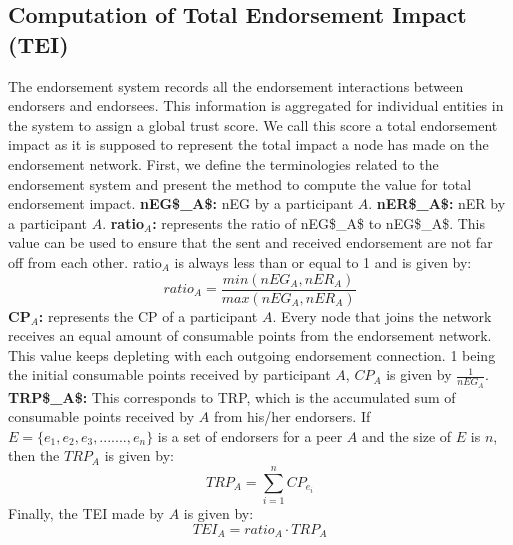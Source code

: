 \subsection{Computation of Total Endorsement Impact (TEI)} \label{computetei}
The endorsement system records all the endorsement interactions between
endorsers and endorsees. This information is aggregated for individual entities
in the system to assign a global trust score. We call this score a total
endorsement impact as it is supposed to represent the total impact a node has
made on the endorsement network. First, we define the terminologies related to
the endorsement system and present the method to compute the value for total
endorsement impact.\newline 
\textbf{{\acrshort{nEG$_A$:}}} \ac{nEG} by a participant $A$. \newline
\textbf{{\acrshort{nER$_A$:}}} \ac{nER} by a participant $A$. \newline
\textbf{ratio$_A$:} represents the ratio of \acrshort{nEG$_A$} to
\acrshort{nEG$_A$}. This value can be used to ensure that the sent and received
endorsement are not far off from each other. ratio$_{A}$ is always less than or
equal to 1 and is given by:   
\begin{equation}
	ratio_A = \frac{min(nEG_A, nER_A)}{max(nEG_A, nER_A)}
\end{equation}
\textbf{\acrshort{CP}$_A$:} represents the \ac{CP} of a participant $A$. Every
node that joins the network receives an equal amount of consumable points from
the endorsement network. This value keeps depleting with each outgoing
endorsement connection. 1 being the initial consumable points received by
participant $A$, $CP_{A}$ is given by $\frac{1}{nEG_A}$.\newline
\textbf{\acrshort{TRP$_A$}:} This corresponds to \ac{TRP}, which is the
accumulated sum of consumable points received by $A$ from his/her endorsers.
\newline
If $E = \{e_{1}, e_{2}, e_{3}, ......., e_{n}\}$ is a set of endorsers for a
peer $A$ and the size of $E$ is $n$, then the $TRP_{A}$ is given by:
\begin{equation}
	TRP_A = \sum_{i=1}^{n}CP_{e_{i}}
\end{equation}
Finally, the \ac{TEI} made by $A$ is given by: 
\begin{equation}
	TEI_A = ratio_A \cdot TRP_A
\end{equation}

